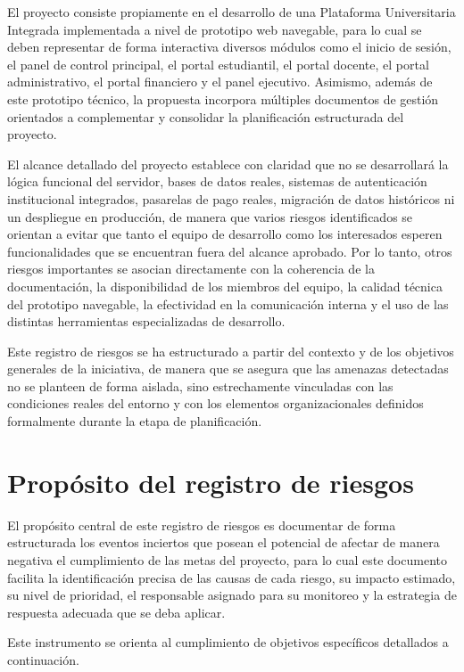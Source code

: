 \documentclass[11pt,spanish]{article}
\begin{document}
El proyecto consiste propiamente en el desarrollo de una Plataforma Universitaria Integrada implementada a nivel de prototipo web navegable, para lo cual se deben representar de forma interactiva diversos módulos como el inicio de sesión, el panel de control principal, el portal estudiantil, el portal docente, el portal administrativo, el portal financiero y el panel ejecutivo. Asimismo, además de este prototipo técnico, la propuesta incorpora múltiples documentos de gestión orientados a complementar y consolidar la planificación estructurada del proyecto.

El alcance detallado del proyecto establece con claridad que no se desarrollará la lógica funcional del servidor, bases de datos reales, sistemas de autenticación institucional integrados, pasarelas de pago reales, migración de datos históricos ni un despliegue en producción, de manera que varios riesgos identificados se orientan a evitar que tanto el equipo de desarrollo como los interesados esperen funcionalidades que se encuentran fuera del alcance aprobado. Por lo tanto, otros riesgos importantes se asocian directamente con la coherencia de la documentación, la disponibilidad de los miembros del equipo, la calidad técnica del prototipo navegable, la efectividad en la comunicación interna y el uso de las distintas herramientas especializadas de desarrollo.

Este registro de riesgos se ha estructurado a partir del contexto y de los objetivos generales de la iniciativa, de manera que se asegura que las amenazas detectadas no se planteen de forma aislada, sino estrechamente vinculadas con las condiciones reales del entorno y con los elementos organizacionales definidos formalmente durante la etapa de planificación.

\section{Propósito del registro de riesgos}

El propósito central de este registro de riesgos es documentar de forma estructurada los eventos inciertos que posean el potencial de afectar de manera negativa el cumplimiento de las metas del proyecto, para lo cual este documento facilita la identificación precisa de las causas de cada riesgo, su impacto estimado, su nivel de prioridad, el responsable asignado para su monitoreo y la estrategia de respuesta adecuada que se deba aplicar.

Este instrumento se orienta al cumplimiento de objetivos específicos detallados a continuación.
\end{document}
